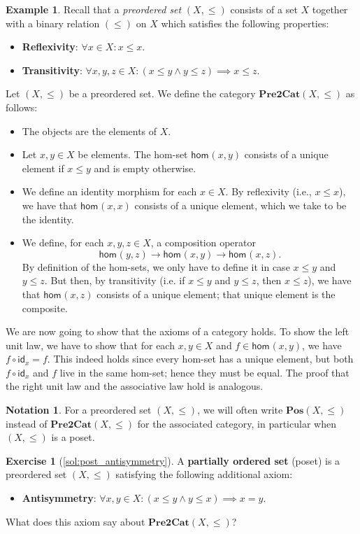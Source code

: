\documentclass[a4paper,11pt, oneside,titlepage=false]{scrbook}
\theoremstyle{plain}
\theoremstyle{definition}
\newtheorem{exa}[thm]{Example}
\newtheorem{exer}[thm]{Exercise}
\newtheorem{nota}[thm]{Notation}
\newcommand{\cfont}[1]{\ensuremath{\mathsf{#1}}}
\newcommand{\Catb}[1]{\mathbf{#1}}
\newcommand{\POS}{\Catb{Pos}}
\newcommand{\PREtoCAT}{\Catb{Pre2Cat}}
\newcommand{\Hom}[3][]{\cfont{hom}_{#1}(#2,#3)}
\newcommand{\Id}[1][]{\cfont{id}_{#1}}
\newcommand{\co}[2]{\ensuremath{#2 \circ #1}}
\begin{document}
\begin{exa}\label{example:posetcategories}
Recall that a \textit{preordered set} $(X,\leq)$ consists of a set $X$ together with a binary relation $(\leq)$ on $X$ which satisfies the following properties:
\begin{itemize}
\item \textbf{Reflexivity}: $\forall x\in X: x\leq x$.
\item \textbf{Transitivity}: $\forall x,y,z\in X: \left(x\leq y \wedge y\leq z\right) \implies x\leq z$.
\end{itemize}

  Let $(X,\leq)$ be a preordered set. We define the category $\PREtoCAT(X,\leq)$ as follows:
\begin{itemize}
\item The objects are the elements of $X$.
\item Let $x,y \in X$ be elements. The hom-set $\Hom x y$ consists of a unique element if $x\leq y$ and is empty otherwise.
\item  We define an identity morphism for each $x\in X$.
  By reflexivity (i.e., $x\leq x$), we have that $\Hom x x$ consists of a unique element, which we take to be the identity.
\item We define, for each $x,y,z\in X$, a composition operator
\[
\Hom y z \to \Hom x y \to \Hom x z.
\]
By definition of the hom-sets, we only have to define it in case $x\leq y$ and $y\leq z$.
But then, by transitivity (i.e. if $x\leq y$ and $y\leq z$, then $x\leq z$), we have that $\Hom x z$ consists of a unique element; that unique element is the composite.
\end{itemize}
%
We are now going to show that the axioms of a category holds.
To show the left unit law, we have to show that for each $x,y\in X$ and $f\in \Hom x y$, we have $\co{\Id[x]}{f} = f$.
This indeed holds since every hom-set has a unique element, but both $\co{\Id[x]}{f}$ and $f$ live in the same hom-set; hence they must be equal.
The proof that the right unit law and the associative law hold is analogous.
\end{exa}

\begin{nota}
For a preordered set $(X,\leq)$, we will often write $\POS(X,\leq)$ instead of $\PREtoCAT(X,\leq)$ for the associated category, in particular when $(X,\leq)$ is a poset.
\end{nota}

\begin{exer}[\cref{sol:post_antisymmetry}]\label{exer:post_antisymmetry}
  A \textbf{partially ordered set} (poset) is a preordered set $(X,\leq)$ satisfying the following additional axiom:
  \begin{itemize}
  \item \textbf{Antisymmetry}: $\forall x,y\in X: (x\leq y \wedge y\leq x) \implies x=y$.
  \end{itemize}
  What does this axiom say about $\PREtoCAT(X,\leq)$?
\end{exer}
\end{document}

